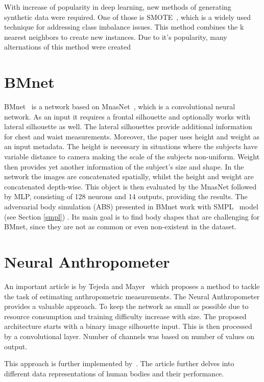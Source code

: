 With increase of popularity in deep learning, new methods of generating synthetic data were required. One of those is SMOTE~\cite{smote}, which is a widely used technique for addressing class imbalance issues. This method combines the k nearest neighbors to create new instances. Due to it's popularity, many alternations of this method were created~\cite{smote2,smote3,smote4}

\section{BMnet}
BMnet~\cite{BodyM} is a network based on MnasNet~\cite{mnasnet}, which is a convolutional neural network.  As an input it requires a frontal silhouette and optionally works with lateral silhouette as well. The lateral silhouettes provide additional information for chest and waist measurements. Moreover, the paper uses height and weight as an input metadata. The height is necessary in situations where the subjects have variable distance to camera making the scale of the subjects non-uniform. Weight then provides yet another information of the subject's size and shape. In the network the images are concatenated spatially, whilst the height and weight are concatenated depth-wise. This object is then evaluated by the MnasNet followed by MLP, consisting of 128 neurons and 14 outputs, providing the results.
The adversarial body simulation (ABS) presented in BMnet work with SMPL~\cite{smpl} model (see Section \ref{smpl}) . Its main goal is to find body shapes that are challenging for BMnet, since they are not as common or even non-existent in the dataset.
 

\section{Neural Anthropometer}
An important article is by Tejeda and Mayer~\cite{source} which proposes a method to tackle the task of estimating anthropometric measurements. The Neural Anthropometer provides a valuable approach. To keep the network as small as possible due to resource consumption and training difficulty increase with size. The proposed architecture starts with a binary image silhouette input. This is then processed by a convolutional layer. Number of channels was based on number of values on output. 

This approach is further implemented by~\cite{super}. The article further delves into different data representations of human bodies and their performance.  
